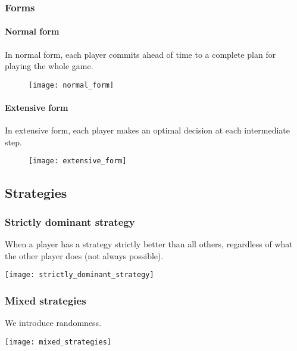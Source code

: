 \subsubsection{Forms}

\paragraph{Normal form}

In normal form, each player commits ahead of time to a complete plan for playing the whole game.

\begin{figure}[H]
    \centering
    \texttt{[image: normal\_form]}
\end{figure}

\paragraph{Extensive form}

In extensive form, each player makes an optimal decision at each intermediate step.

\begin{figure}[H]
    \centering
    \texttt{[image: extensive\_form]}
\end{figure}

\subsection{Strategies}

\subsubsection{Strictly dominant strategy}

When a player has a strategy strictly better than all others, regardless of what the other player does (not always possible).

\begin{table}[H]
    \centering
    \texttt{[image: strictly\_dominant\_strategy]}
\end{table}

\subsubsection{Mixed strategies}

We introduce randomness.

\begin{table}[H]
    \centering
    \texttt{[image: mixed\_strategies]}
\end{table}

